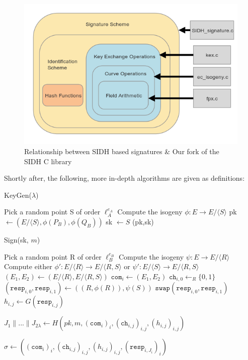\begin{figure}[htb]
\centering
\includegraphics[scale=0.7]{fullmapwcurve.png} %
\caption{Relationship between SIDH based signatures \& Our fork of the SIDH C library}
\label{fig:fullmap} %
\end{figure}


Shortly after, the following, more in-depth algorithms are given as definitions: 

\begin{algorithm}
\caption{KeyGen($\lambda$)}\label{euclid}
\begin{algorithmic}[1]
\State Pick a random point S of order $\ell^{e_{A}}_{A}$
\State Compute the isogeny $\phi: E \rightarrow E/\langle S \rangle$
\State pk $\gets (E/\langle S \rangle, \phi(P_{B}), \phi(Q_{B}))$
\State sk $\gets S$
\State \Return (pk,sk)
\end{algorithmic}
\end{algorithm}

\begin{algorithm}
\caption{Sign(sk, $m$)}\label{euclid}
\begin{algorithmic}[1]
	\State Pick a random point R of order $\ell^{e_{B}}_{B}$
	\State Compute the isogeny $\psi: E \rightarrow E/\langle R \rangle$
	\State Compute either $\phi' : E/\langle R \rangle \rightarrow E/\langle R,S \rangle$ or $\psi' : E/\langle S \rangle \rightarrow E/\langle R,S \rangle$
	\State $(E_{1},E_{2}) \gets (E/\langle R \rangle, E/\langle R,S \rangle)$
	\State $\texttt{com}_{i} \gets (E_{1}, E_{2})$
	\State $\texttt{ch}_{i,0} \gets_{R} \{0,1\}$
	\State $(\texttt{resp}_{i,0}, \texttt{resp}_{i,1}) \gets ((R,\phi(R)), \psi(S))$
		\State $\texttt{swap}(\texttt{resp}_{i,0},\texttt{resp}_{i,1})$
	\EndIf
	\State $h_{i,j} \gets G(\texttt{resp}_{i,j})$
\EndFor

\State $J_{1} \parallel ... \parallel J_{2\lambda} \gets H(pk, m, (\texttt{com}_{i})_{i},(\texttt{ch}_{i,j})_{i,j},(h_{i,j})_{i,j})$

\State \Return $\sigma \gets ((\texttt{com}_{i})_{i}, (\texttt{ch}_{i,j})_{i,j}, (h_{i,j})_{i,j}, (\texttt{resp}_{i,J_{i}})_{i})$
\end{algorithmic}
\end{algorithm}

